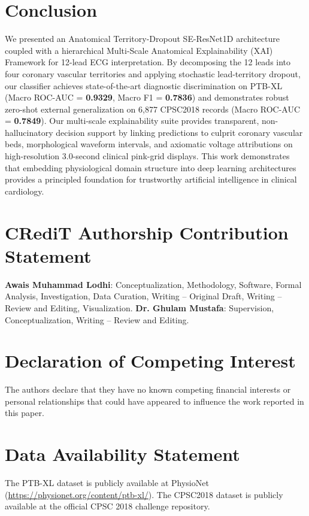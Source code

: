 \documentclass[5p,twocolumn,10pt]{elsarticle}
\begin{document}
\section{Conclusion}
\label{sec:conclusion}
We presented an Anatomical Territory-Dropout SE-ResNet1D architecture coupled with a hierarchical Multi-Scale Anatomical Explainability (XAI) Framework for 12-lead ECG interpretation. By decomposing the 12 leads into four coronary vascular territories and applying stochastic lead-territory dropout, our classifier achieves state-of-the-art diagnostic discrimination on PTB-XL (Macro ROC-AUC = \textbf{0.9329}, Macro F1 = \textbf{0.7836}) and demonstrates robust zero-shot external generalization on 6,877 CPSC2018 records (Macro ROC-AUC = \textbf{0.7849}). Our multi-scale explainability suite provides transparent, non-hallucinatory decision support by linking predictions to culprit coronary vascular beds, morphological waveform intervals, and axiomatic voltage attributions on high-resolution 3.0-second clinical pink-grid displays. This work demonstrates that embedding physiological domain structure into deep learning architectures provides a principled foundation for trustworthy artificial intelligence in clinical cardiology.

\section*{CRediT Authorship Contribution Statement}
\textbf{Awais Muhammad Lodhi}: Conceptualization, Methodology, Software, Formal Analysis, Investigation, Data Curation, Writing -- Original Draft, Writing -- Review and Editing, Visualization.
\textbf{Dr. Ghulam Mustafa}: Supervision, Conceptualization, Writing -- Review and Editing.

\section*{Declaration of Competing Interest}
The authors declare that they have no known competing financial interests or personal relationships that could have appeared to influence the work reported in this paper.

\section*{Data Availability Statement}
The PTB-XL dataset is publicly available at PhysioNet (\url{https://physionet.org/content/ptb-xl/}). The CPSC2018 dataset is publicly available at the official CPSC 2018 challenge repository.



\end{document}
